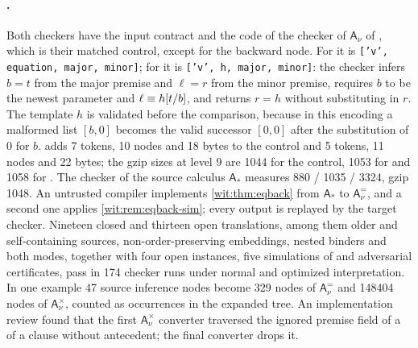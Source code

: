 \paragraph{.}
Both checkers have the input contract and the code of the checker of
$\mathsf{A}_{\nu}$ of , which is their matched
control, except for the backward node.  For  it is
\texttt{['v', equation, major, minor]}; for  it is
\texttt{['v', h, major, minor]}: the checker infers $b=t$ from the major
premise and $\ell=r$ from the minor premise, requires $b$ to be the newest
parameter and $\ell\equiv h[t/b]$, and returns $r=h$ without
substituting in $r$.  The template $h$ is validated before the comparison,
because in this encoding a malformed list $[b,0]$ becomes the valid
successor $[0,0]$ after the substitution of $0$ for $b$.  
adds 7 tokens, 10 nodes and 18 bytes to the control and  5
tokens, 11 nodes and 22 bytes; the gzip sizes at level 9 are 1044 for the
control, 1053 for  and 1058 for .  The checker of the source calculus
$\mathsf{A}_{\ast}$ measures 880 / 1035 / 3324, gzip 1048.  An untrusted
compiler implements \cref{wit:thm:eqback} from $\mathsf{A}_{\ast}$ to
$\mathsf{A}^{=}_{\nu}$, and a second one applies \cref{wit:rem:eqback-sim};
every output is replayed by the target checker.  Nineteen closed and
thirteen open translations, among them older and self-containing
 sources, non-order-preserving embeddings, nested binders and
both modes, together with four open  instances, five
simulations of  and adversarial certificates, pass in 174
checker runs under normal and optimized interpretation.  In one example 47
source inference nodes become 329 nodes of $\mathsf{A}^{=}_{\nu}$ and
148404 nodes of $\mathsf{A}^{\times}_{\nu}$, counted as occurrences in the
expanded tree.  An implementation review found that the first
$\mathsf{A}^{\times}_{\nu}$ converter traversed the ignored premise field of
a  of a clause without antecedent; the final converter drops
it.

